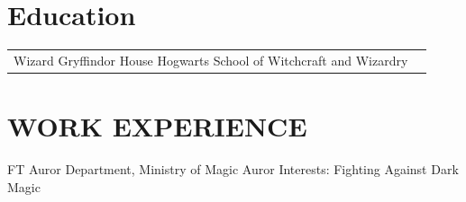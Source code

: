 \documentclass[10pt]{article} %
\begin{document}
\begin{paracol}{2}

\section{Education} 





\begin{supertabular}{rl} %
	{Wizard} %
	{} %
	{Gryffindor House} %
	{Hogwarts School of Witchcraft and Wizardry} %
\end{supertabular}



\section{WORK EXPERIENCE}





{FT} %
{Auror Department, Ministry of Magic} %
{Auror} %
{Interests: Fighting Against Dark Magic} %

\end{paracol}
\end{document}
